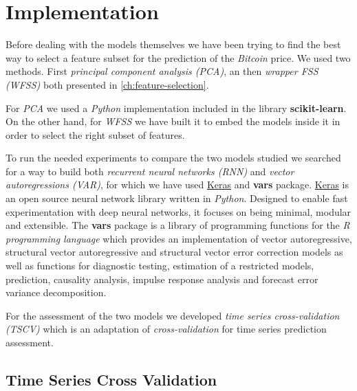 
\chapter{Implementation}
\label{ch:implementation}


Before dealing with the models themselves we have been trying to find
the best way to select a feature subset for the prediction of the
\textit{Bitcoin} price. We used two methods. First \textit{principal
component analysis (PCA)}, an then \textit{wrapper FSS (WFSS)} both
presented in \autoref{ch:feature-selection}.

For \textit{PCA} we used a \textit{Python} implementation included in
the library \textbf{scikit-learn}. On the other hand, for
\textit{WFSS} we have built it to embed the models inside it in order
to select the right subset of features.

To run the needed experiments to compare the two models studied we
searched for a way to build both \textit{recurrent neural networks
(RNN)} and \textit{vector autoregressions (VAR)}, for which we have
used \href{http://www.keras.io}{Keras} and \textbf{vars} package.
\href{http://www.keras.io}{Keras} is an open source neural network
library written in \textit{Python}. Designed to enable fast
experimentation with deep neural networks, it focuses on being
minimal, modular and extensible. The \textbf{vars} package is a
library of programming functions for the \textit{R programming
language} which provides an implementation of vector autoregressive,
structural vector autoregressive and structural vector error
correction models as well as functions for diagnostic testing,
estimation of a restricted models, prediction, causality analysis,
impulse response analysis and forecast error variance decomposition.

For the assessment of the two models we developed \textit{time series
cross-validation (TSCV)} which is an adaptation of
\textit{cross-validation} for time series prediction assessment.

\section{Time Series Cross Validation}
\label{sec:tscv}

